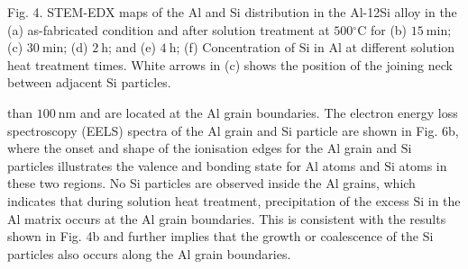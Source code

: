 \documentclass[10pt]{article}
\begin{document}
Fig. 4. STEM-EDX maps of the $\mathrm{Al}$ and Si distribution in the Al-12Si alloy in the (a) as-fabricated condition and after solution treatment at $500{ }^{\circ} \mathrm{C}$ for (b) $15 \mathrm{~min}$; (c) $30 \mathrm{~min}$; (d) $2 \mathrm{~h}$; and (e) $4 \mathrm{~h}$; (f) Concentration of $\mathrm{Si}$ in $\mathrm{Al}$ at different solution heat treatment times. White arrows in (c) shows the position of the joining neck between adjacent $\mathrm{Si}$ particles.

than $100 \mathrm{~nm}$ and are located at the Al grain boundaries. The electron energy loss spectroscopy (EELS) spectra of the Al grain and Si particle are shown in Fig. 6b, where the onset and shape of the ionisation edges for the $\mathrm{Al}$ grain and $\mathrm{Si}$ particles illustrates the valence and bonding state for $\mathrm{Al}$ atoms and $\mathrm{Si}$ atoms in these two regions. No Si particles are observed inside the Al grains, which indicates that during solution heat treatment, precipitation of the excess $\mathrm{Si}$ in the $\mathrm{Al}$ matrix occurs at the $\mathrm{Al}$ grain boundaries. This is consistent with the results shown in Fig. 4b and further implies that the growth or coalescence of the Si particles also occurs along the Al grain boundaries.
\end{document}
